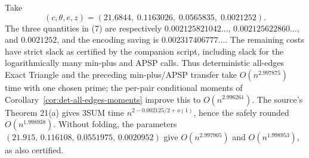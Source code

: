 \documentclass[11pt]{article}
\begin{document}
Take
\[
(c,\theta,e,z)=(21.6844,\;0.1163026,\;0.0565835,\;0.0021252).
\]
The three quantities in (7) are respectively
$0.002125821042\ldots$, $0.002125622860\ldots$, and $0.0021252$, and the
encoding saving is $0.002317406777\ldots$.
The remaining costs have strict slack as certified by the companion script,
including slack for the logarithmically many min-plus and APSP calls.
Thus deterministic all-edges Exact Triangle and the preceding min-plus/APSP
transfer take $O(n^{2.997875})$ time with one chosen prime; the per-pair
conditional moments of Corollary~\ref{cor:det-all-edges-moments} improve
this to $O(n^{2.996261})$. The source's Theorem 21(a) gives
3SUM time $n^{2-0.002125/2+o(1)}$, hence the safely rounded
$O(n^{1.998938})$. Without folding, the parameters
$(21.915,\,0.116108,\,0.0551975,\,0.0020952)$ give $O(n^{2.997905})$ and
$O(n^{1.998953})$, as also certified.
\end{document}
